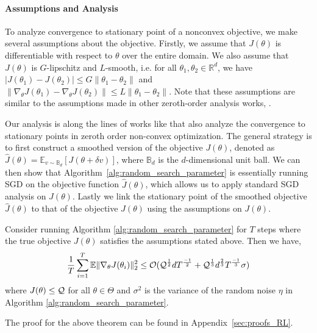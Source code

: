 \paragraph{Assumptions and Analysis}
\label{sec:assumptions_parameter}

To analyze convergence to stationary point of a nonconvex objective, we make several assumptions about the objective. Firstly, we assume that $J(\theta)$ is differentiable with respect to $\theta$ over the entire domain. We also assume that $J(\theta)$ is $G$-lipschitz and $L$-smooth, i.e. for all $\theta_1, \theta_2 \in \mathbb{R}^d$, we have $|J(\theta_1) - J(\theta_2)| \leq G\|\theta_1 - \theta_2\|$ and $\|\nabla_\theta J(\theta_1) - \nabla_\theta J(\theta_2)\|\leq L\|\theta_1 - \theta_2\|$. 
%
Note that these assumptions are similar to the assumptions made in other zeroth-order analysis works, \citep{flaxman2005online, agarwal2010optimal, duchi2015optimal, shamir2013complexity, ghadimi2013stochastic, nesterov2017random}.

%
%

Our analysis is along the lines of works like \citep{ghadimi2013stochastic,
  nesterov2017random} that also analyze the convergence to stationary points in
zeroth order non-convex optimization. The general strategy is to first construct a smoothed version of the objective $J(\theta)$, denoted as $\hat{J}(\theta) = \mathbb{E}_{v\sim \mathbb{B}_{d}}[J(\theta+\delta v)]$, where $\mathbb{B}_d$ is the $d$-dimensional unit ball. We can then show that Algorithm~\ref{alg:random_search_parameter} is essentially running SGD on the objective function $\hat{J}(\theta)$, which allows us to apply standard SGD analysis on $\hat{J}(\theta)$. Lastly we link the stationary point of the smoothed objective $\hat{J}(\theta)$ to that of the objective $J(\theta)$ using the assumptions on ${J}(\theta)$.

\begin{theorem}
  \label{theorem:parameter-convergence}
  Consider running Algorithm \ref{alg:random_search_parameter} for $T$
  steps where the true objective $J(\theta)$ satisfies the assumptions stated above.
  Then we have,
  \begin{equation}
    \label{eq:parameter-convergence}
    \frac{1}{T}\sum_{i=1}^T \mathbb{E}\|\nabla_\theta
    J(\theta_i)\|_2^2 \leq \mathcal{O}(\mathcal{Q}^{\frac{1}{2}}dT^{\frac{-1}{2}} + \mathcal{Q}^{\frac{1}{3}}d^{\frac{2}{3}}T^{\frac{-1}{3}}\sigma)
  \end{equation}
  where $J(\theta)\leq \mathcal{Q}$ for all $\theta \in \Theta$ and $\sigma^2$ is the variance of the random noise $\eta$ in Algorithm \ref{alg:random_search_parameter}.
\end{theorem}
The proof for the above theorem can be found in Appendix~\ref{sec:proofs_RL}.

